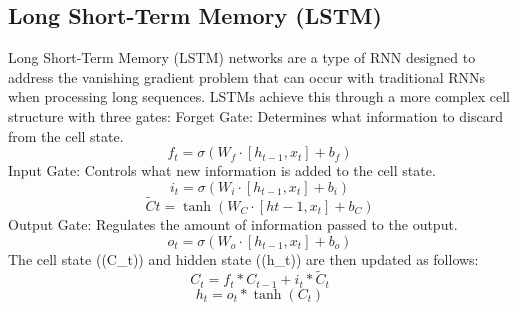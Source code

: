 \documentclass{ieeeojies}
\begin{document}
\subsection{Long Short-Term Memory (LSTM)}
Long Short-Term Memory (LSTM) networks are a type of RNN designed to address the vanishing gradient problem that can occur with traditional RNNs when processing long sequences. LSTMs achieve this through a more complex cell structure with three gates:
Forget Gate: Determines what information to discard from the cell state.
\begin{dmath*}
    f_t = \sigma(W_f \cdot [h_{t-1}, x_t] + b_f)
\end{dmath*}
Input Gate: Controls what new information is added to the cell state.
\begin{dmath*}
    i_t = \sigma(W_i \cdot [h_{t-1}, x_t] + b_i)
\end{dmath*}
\begin{dmath*}
    \tilde{C}t = \tanh(W_C \cdot [h{t-1}, x_t] + b_C)
\end{dmath*}
Output Gate: Regulates the amount of information passed to the output.
\begin{dmath*}
    o_t = \sigma(W_o \cdot [h_{t-1}, x_t] + b_o)
\end{dmath*}
The cell state ((C_t)) and hidden state ((h_t)) are then updated as follows:
\begin{dmath*}
    C_t = f_t * C_{t-1} + i_t * \tilde{C}_t
\end{dmath*}
\begin{dmath*}
    h_t = o_t * \tanh(C_t)
\end{dmath*}
\end{document}
